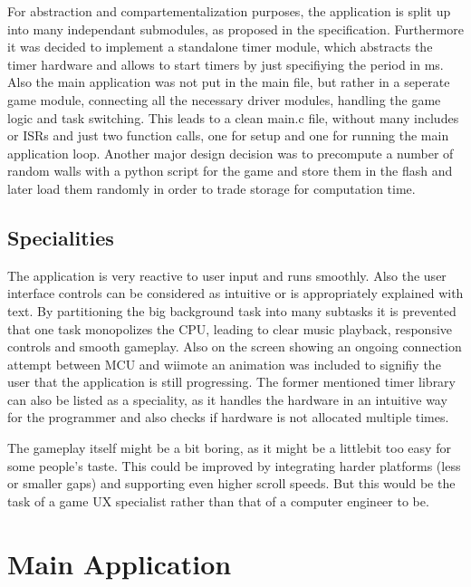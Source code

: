 \documentclass[12pt,a4paper,titlepage,oneside]{article}
\begin{document}
For abstraction and compartementalization purposes, the application is split
up into many independant submodules, as proposed in the specification. Furthermore 
it was decided to implement a standalone timer module, which abstracts the timer
hardware and allows to start timers by just specifiying the period in ms.
Also the main application was not put in the main file, but rather in a 
seperate game module, connecting all the necessary driver modules, handling
the game logic and task switching. This leads to a clean main.c file, without
many includes or ISRs and just two function calls, one for setup and one for
running the main application loop. Another major design decision was to 
precompute a number of random walls with a python script for the game and store
them in the flash and later load them randomly in order to trade storage for 
computation time.

\subsection{Specialities}

The application is very reactive to user input and runs smoothly. Also the
user interface controls can be considered as intuitive or is appropriately
explained with text. By partitioning the big background task into many subtasks
it is prevented that one task monopolizes the CPU, leading to clear music 
playback, responsive controls and smooth gameplay. Also on the screen showing
an ongoing connection attempt between MCU and wiimote an animation was included
to signifiy the user that the application is still progressing. The former
mentioned timer library can also be listed as a speciality, as it handles the
hardware in an intuitive way for the programmer and also checks if hardware
is not allocated multiple times.

The gameplay itself might be a bit boring, as it might be a littlebit too
easy for some people's taste. This could be improved by integrating harder
platforms (less or smaller gaps) and supporting even higher scroll speeds.
But this would be the task of a game UX specialist rather than that of a 
computer engineer to be.

\section{Main Application}
\end{document}
